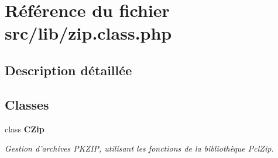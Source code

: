 \section{Référence du fichier src/lib/zip.class.php}
\label{zip_8class_8php}


\subsection{Description détaillée}


\subsection*{Classes}
\begin{CompactItemize}
\item 
class {\bf CZip}
\begin{CompactList}\small\item\em Gestion d'archives PKZIP, utilisant les fonctions de la bibliothèque PclZip. \item\end{CompactList}\end{CompactItemize}
